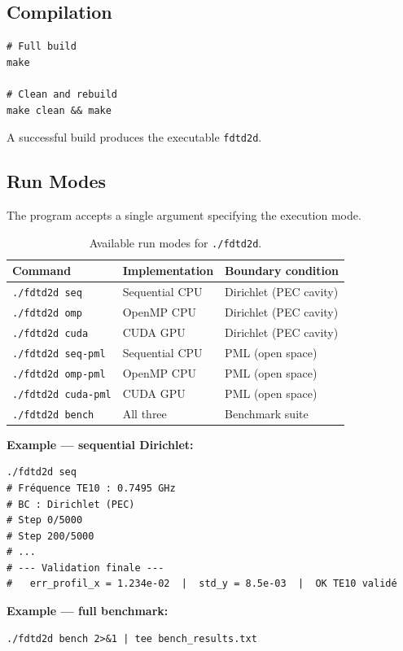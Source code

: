 \documentclass[12pt,a4paper]{article}
\begin{document}
\subsection{Compilation}

\begin{verbatim}
# Full build
make

# Clean and rebuild
make clean && make

\end{verbatim}

A successful build produces the executable \texttt{fdtd2d}.

\subsection{Run Modes}

The program accepts a single argument specifying the execution mode.

\begin{table}[H]
\centering
\caption{Available run modes for \texttt{./fdtd2d}.}
\label{tab:modes}
\begin{tabular}{lll}
\toprule
Command & Implementation & Boundary condition \\
\midrule
\texttt{./fdtd2d seq}      & Sequential CPU  & Dirichlet (PEC cavity) \\
\texttt{./fdtd2d omp}      & OpenMP CPU      & Dirichlet (PEC cavity) \\
\texttt{./fdtd2d cuda}     & CUDA GPU        & Dirichlet (PEC cavity) \\
\texttt{./fdtd2d seq-pml}  & Sequential CPU  & PML (open space)       \\
\texttt{./fdtd2d omp-pml}  & OpenMP CPU      & PML (open space)       \\
\texttt{./fdtd2d cuda-pml} & CUDA GPU        & PML (open space)       \\
\texttt{./fdtd2d bench}    & All three       & Benchmark suite        \\
\midrule
\end{tabular}
\end{table}

\textbf{Example — sequential Dirichlet:}
\begin{verbatim}
./fdtd2d seq
# Fréquence TE10 : 0.7495 GHz
# BC : Dirichlet (PEC)
# Step 0/5000
# Step 200/5000
# ...
# --- Validation finale ---
#   err_profil_x = 1.234e-02  |  std_y = 8.5e-03  |  OK TE10 validé
\end{verbatim}

\textbf{Example — full benchmark:}
\begin{verbatim}
./fdtd2d bench 2>&1 | tee bench_results.txt
\end{verbatim}
\end{document}
